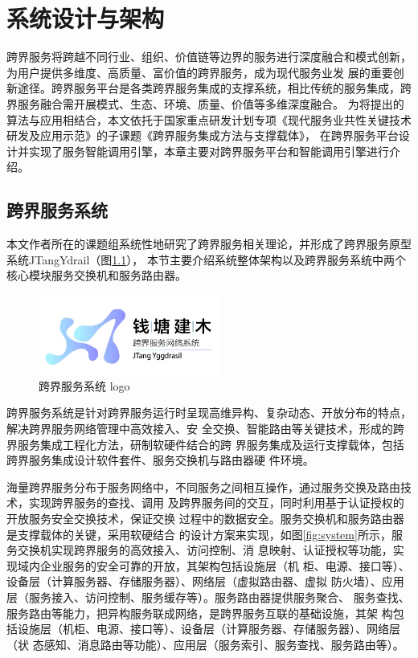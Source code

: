 \chapter{系统设计与架构}
跨界服务将跨越不同行业、组织、价值链等边界的服务进行深度融合和模式创新，为用户提供多维度、高质量、富价值的跨界服务，成为现代服务业发
展的重要创新途径。跨界服务平台是各类跨界服务集成的支撑系统，相比传统的服务集成，跨界服务融合需开展模式、生态、环境、质量、价值等多维深度融合。
为将提出的算法与应用相结合，本文依托于国家重点研发计划专项《现代服务业共性关键技术研发及应用示范》的子课题《跨界服务集成方法与支撑载体》，
在跨界服务平台设计并实现了服务智能调用引擎，本章主要对跨界服务平台和智能调用引擎进行介绍。

\section{跨界服务系统}
本文作者所在的课题组系统性地研究了跨界服务相关理论，并形成了跨界服务原型系统JTangYdrail（图\ref{fig:logo}），
本节主要介绍系统整体架构以及跨界服务系统中两个核心模块服务交换机和服务路由器。
\begin{figure}[htbp]
    \centering
    \includegraphics[width=6cm]{./images/jianmu.jpg}
    \caption{跨界服务系统 logo}
    \label{fig:logo}
  \end{figure}
  跨界服务系统是针对跨界服务运行时呈现高维异构、复杂动态、开放分布的特点，解决跨界服务网络管理中高效接入、安
  全交换、智能路由等关键技术，形成的跨界服务集成工程化方法，研制软硬件结合的跨
  界服务集成及运行支撑载体，包括跨界服务集成设计软件套件、服务交换机与路由器硬
  件环境。

  海量跨界服务分布于服务网络中，不同服务之间相互操作，通过服务交换及路由技术，实现跨界服务的查找、调用
  及跨界服务间的交互，同时利用基于认证授权的开放服务安全交换技术，保证交换
  过程中的数据安全。服务交换机和服务路由器是支撑载体的关键，采用软硬结合
  的设计方案来实现，如图\ref{fig:system}所示，服务交换机实现跨界服务的高效接入、访问控制、消
  息映射、认证授权等功能，实现域内企业服务的安全可靠的开放，其架构包括设施层（机
  柜、电源、接口等）、设备层（计算服务器、存储服务器）、网络层（虚拟路由器、虚拟
  防火墙）、应用层（服务接入、访问控制、服务缓存等）。服务路由器提供服务聚合、
  服务查找、服务路由等能力，把异构服务联成网络，是跨界服务互联的基础设施，其架
  构包括设施层（机柜、电源、接口等）、设备层（计算服务器、存储服务器）、网络层（状
  态感知、消息路由等功能）、应用层（服务索引、服务查找、服务路由等）。

